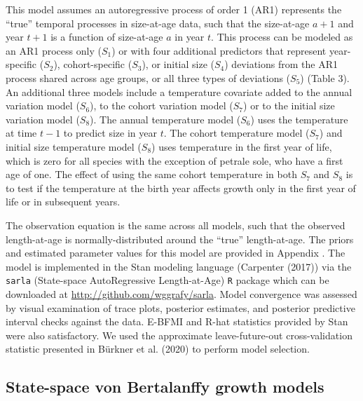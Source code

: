 \documentclass[
]{article}
\begin{document}
This model assumes an autoregressive process of order 1 (AR1) represents
the ``true'' temporal processes in size-at-age data, such that the
size-at-age \(a+1\) and year \(t+1\) is a function of size-at-age \(a\)
in year \(t\). This process can be modeled as an AR1 process only
(\(S_1\)) or with four additional predictors that represent
year-specific (\(S_2\)), cohort-specific (\(S_3\)), or initial size
(\(S_4\)) deviations from the AR1 process shared across age groups, or
all three types of deviations (\(S_5\)) (Table 3). An additional three
models include a temperature covariate added to the annual variation
model (\(S_6\)), to the cohort variation model (\(S_7\)) or to the
initial size variation model (\(S_8\)). The annual temperature model
(\(S_6\)) uses the temperature at time \(t-1\) to predict size in year
\(t\). The cohort temperature model (\(S_7\)) and initial size
temperature model (\(S_8\)) uses temperature in the first year of life,
which is zero for all species with the exception of petrale sole, who
have a first age of one. The effect of using the same cohort temperature
in both \(S_7\) and \(S_8\) is to test if the temperature at the birth
year affects growth only in the first year of life or in subsequent
years.

The observation equation is the same across all models, such that the
observed length-at-age is normally-distributed around the ``true''
length-at-age. The priors and estimated parameter values for this model
are provided in Appendix . The model is implemented in the Stan modeling
language (Carpenter (2017)) via the \texttt{sarla} (State-space
AutoRegressive Length-at-Age) \texttt{R} package which can be downloaded
at \url{http://github.com/wggrafy/sarla}. Model convergence was assessed
by visual examination of trace plots, posterior estimates, and posterior
predictive interval checks against the data. E-BFMI and R-hat statistics
provided by Stan were also satisfactory. We used the approximate
leave-future-out cross-validation statistic presented in Bürkner et al.
(2020) to perform model selection.

\hypertarget{state-space-von-bertalanffy-growth-models}{%
\subsection{State-space von Bertalanffy growth
models}\label{state-space-von-bertalanffy-growth-models}}
\end{document}

